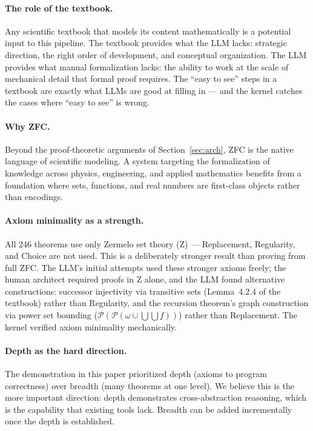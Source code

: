 \documentclass[letterpaper]{article}
\begin{document}
\paragraph{The role of the textbook.}
Any scientific textbook that models its content mathematically is a potential
input to this pipeline. The textbook provides what the LLM lacks: strategic
direction, the right order of development, and conceptual organization. The
LLM provides what manual formalization lacks: the ability to work at the
scale of mechanical detail that formal proof requires. The ``easy to see''
steps in a textbook are exactly what LLMs are good at filling in --- and the
kernel catches the cases where ``easy to see'' is wrong.

\paragraph{Why ZFC.}
Beyond the proof-theoretic arguments of Section~\ref{sec:arch}, ZFC is the
native language of scientific modeling. A system targeting the formalization
of knowledge across physics, engineering, and applied mathematics benefits
from a foundation where sets, functions, and real numbers are first-class
objects rather than encodings.

\paragraph{Axiom minimality as a strength.}
All 246 theorems use only Zermelo set theory (Z) --- Replacement, Regularity,
and Choice are not used. This is a deliberately stronger result than proving
from full ZFC. The LLM's initial attempts used these stronger axioms freely;
the human architect required proofs in Z alone, and the LLM found alternative
constructions: successor injectivity via transitive sets (Lemma~4.2.4 of the
textbook) rather than Regularity, and the recursion theorem's graph
construction via power set bounding
($\mathcal{P}(\mathcal{P}(\omega \cup \bigcup\bigcup f))$) rather than
Replacement. The kernel verified axiom minimality mechanically.

\paragraph{Depth as the hard direction.}
The demonstration in this paper prioritized depth (axioms to program
correctness) over breadth (many theorems at one level). We believe this is
the more important direction: depth demonstrates cross-abstraction reasoning,
which is the capability that existing tools lack. Breadth can be added
incrementally once the depth is established.
\end{document}
